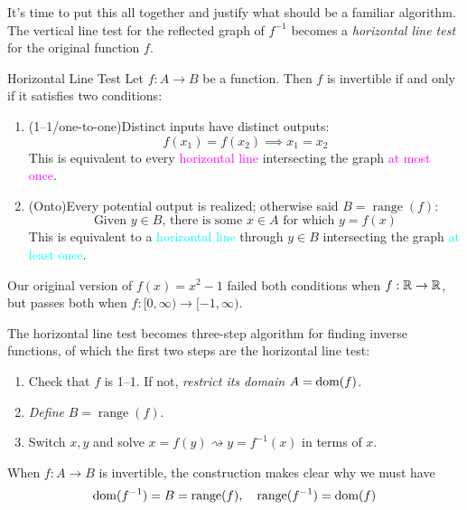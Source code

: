 \goodbreak

It's time to put this all together and justify what should be a familiar algorithm. The vertical line test for the reflected graph of $f^{-1}$ becomes a \emph{horizontal line test} for the original function $f$.

\begin{thm}{Horizontal Line Test}{}
Let $f:A\to B$ be a function. Then $f$ is invertible if and only if it satisfies two conditions:
\begin{enumerate}
  \item (1--1/one-to-one)\lstsp Distinct inputs have distinct outputs:\footnotemark
  \[f(x_1)=f(x_2)\implies x_1=x_2\]
  This is equivalent to every \textcolor{magenta}{horizontal line} intersecting the graph \textcolor{magenta}{at most once}.
  \item (Onto)\lstsp Every potential output is realized; otherwise said $B=\operatorname{range}(f)$:
  \[\text{Given $y\in B$, there is some $x\in A$ for which $y=f(x)$}\]
  This is equivalent to a \textcolor{cyan}{horizontal line} through $y\in B$ intersecting the graph \textcolor{cyan}{at least once}.
\end{enumerate}
\end{thm}


Our original version of $f(x)=x^2-1$ failed both conditions when $f:\mathbb{R}\to\mathbb{R}$, but passes both when $f:[0,\infty)\to[-1,\infty)$.\smallbreak

The horizontal line test becomes three-step algorithm for finding inverse functions, of which the first two steps are the horizontal line test:
\begin{enumerate}
  \item Check that $f$ is 1--1. If not, \emph{restrict its domain} $A=\operatorname{dom}(f)$.
	\item \emph{Define} $B=\operatorname{range}(f)$.
	\item Switch $x,y$ and solve $x=f(y)\rightsquigarrow y=f^{-1}(x)$ in terms of $x$.
\end{enumerate}

When $f:A\to B$ is invertible, the construction makes clear why we must have
\[\operatorname{dom}(f^{-1})=B=\operatorname{range}(f),\quad \operatorname{range}(f^{-1})=\operatorname{dom}(f)\]

